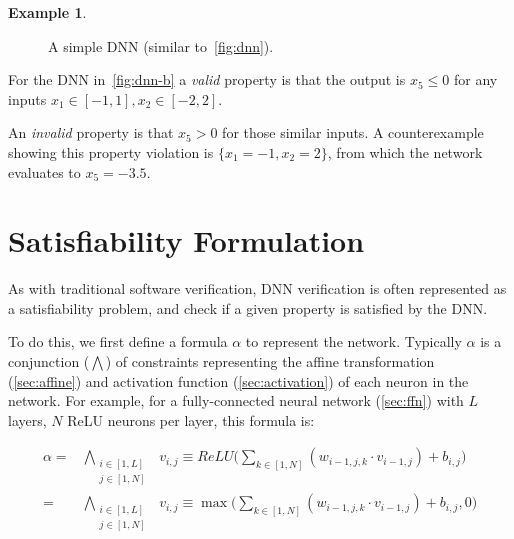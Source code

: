 \documentclass[oneside,11pt,dvipsnames]{book}
\numberwithin{equation}{section}
\theoremstyle{definition}
\newtheorem{example}{Example}[section]
\theoremstyle{remark}
\begin{document}
\begin{example}\label{ex:dnn-b}

\begin{figure}
\centering
{}
\caption{\label{fig:dnn-b}A simple DNN (similar to~\autoref{fig:dnn}).}
\end{figure}

For the DNN in~\autoref{fig:dnn-b} a \emph{valid} property is that the output is $x_5 \le 0$ for any inputs $x_1 \in [-1,1], x_2\in[-2,2]$.

An \emph{invalid} property is that $x_5 > 0$ for those similar inputs.
A counterexample showing this property violation is $\{x_1=-1, x_2=2\}$, from which the network evaluates to $x_5=-3.5$. 
\end{example}



\section{Satisfiability Formulation}\label{sec:satisfiability-and-activation-pattern-search}

As with traditional software verification, DNN verification is often represented as a satisfiability problem, and check if a given property is satisfied by the DNN. 

To do this, we first define a formula $\alpha$ to represent the network. Typically $\alpha$ is a conjunction ($\bigwedge$) of constraints representing the affine transformation (\autoref{sec:affine}) and activation function (\autoref{sec:activation}) of each neuron in the network.
For example, for a fully-connected neural network (\autoref{sec:ffn}) with $L$ layers, $N$ ReLU neurons per layer, this formula is:

\begin{align*}
\alpha = &\bigwedge_{\begin{smallmatrix}i \in [1,L]\\ j \in [1,N]\end{smallmatrix}}~~v_{i,j} \equiv ReLU \Big( \sum_{k \in [1,N]} (w_{i-1,j,k} \cdot v_{i-1,j}) + b_{i,j}\Big)    \\
 = &\bigwedge_{\begin{smallmatrix}i \in [1,L]\\ j \in [1,N]\end{smallmatrix}}~~v_{i,j} \equiv \max \Big( \sum_{k \in [1,N]} (w_{i-1,j,k} \cdot v_{i-1,j}) + b_{i,j}, 0 \Big)
\end{align*}
\end{document}
